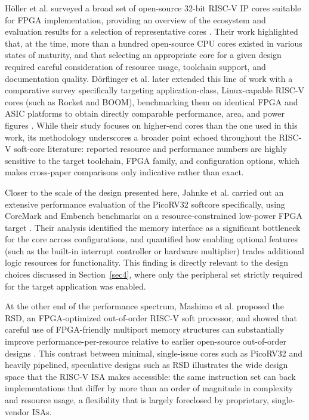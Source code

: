 \documentclass[runningheads]{llncs}
\begin{document}
H{\"o}ller et al. surveyed a broad set of open-source 32-bit RISC-V IP cores suitable for FPGA implementation, providing an overview of the ecosystem and evaluation results for a selection of representative cores \cite{holler2019opensource}. Their work highlighted that, at the time, more than a hundred open-source CPU cores existed in various states of maturity, and that selecting an appropriate core for a given design required careful consideration of resource usage, toolchain support, and documentation quality. D{\"o}rflinger et al. later extended this line of work with a comparative survey specifically targeting application-class, Linux-capable RISC-V cores (such as Rocket and BOOM), benchmarking them on identical FPGA and ASIC platforms to obtain directly comparable performance, area, and power figures \cite{dorflinger2021comparative}. While their study focuses on higher-end cores than the one used in this work, its methodology underscores a broader point echoed throughout the RISC-V soft-core literature: reported resource and performance numbers are highly sensitive to the target toolchain, FPGA family, and configuration options, which makes cross-paper comparisons only indicative rather than exact.

Closer to the scale of the design presented here, Jahnke et al. carried out an extensive performance evaluation of the PicoRV32 softcore specifically, using CoreMark and Embench benchmarks on a resource-constrained low-power FPGA target \cite{jahnke2023performance}. Their analysis identified the memory interface as a significant bottleneck for the core across configurations, and quantified how enabling optional features (such as the built-in interrupt controller or hardware multiplier) trades additional logic resources for functionality. This finding is directly relevant to the design choices discussed in Section~\ref{sec4}, where only the peripheral set strictly required for the target application was enabled.

At the other end of the performance spectrum, Mashimo et al. proposed the RSD, an FPGA-optimized out-of-order RISC-V soft processor, and showed that careful use of FPGA-friendly multiport memory structures can substantially improve performance-per-resource relative to earlier open-source out-of-order designs \cite{mashimo2019opensource}. This contrast between minimal, single-issue cores such as PicoRV32 and heavily pipelined, speculative designs such as RSD illustrates the wide design space that the RISC-V ISA makes accessible: the same instruction set can back implementations that differ by more than an order of magnitude in complexity and resource usage, a flexibility that is largely foreclosed by proprietary, single-vendor ISAs.
\end{document}
